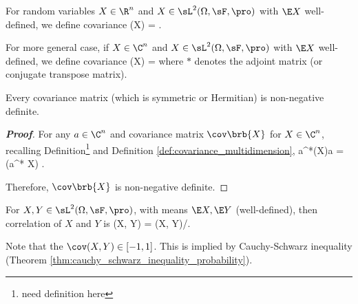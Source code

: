 \begin{definition}\label{def:covariance_multidimension}
For random variables $X\in \R^n$ and $X \in \sL^2(\Omega,\sF,\pro)$ with $\E X$ well-defined, we define covariance
\be
\cov(X) = \E{}.
\ee

For more general case, if $X\in \C^n$ and $X \in \sL^2(\Omega,\sF,\pro)$ with $\E X$ well-defined, we define covariance
\be
\cov(X) = \E{}
\ee
where $*$ denotes the adjoint matrix (or conjugate transpose matrix).
\end{definition}


\begin{proposition}
Every covariance matrix (which is symmetric or Hermitian) is non-negative definite.
\end{proposition}

\begin{proof}[\bf Proof]
For any $a \in \C^n$ and covariance matrix $\cov\brb{X}$ for $X\in \C^n$, recalling Definition\footnote{need definition here} and Definition \ref{def:covariance_multidimension},
\be
a^*\cov(X)a = \var(a^* X) .
\ee

Therefore, $\cov\brb{X}$ is non-negative definite.
\end{proof}

\begin{definition}\label{def:correlation}
For $X, Y \in \sL^2(\Omega,\sF,\pro)$, with means $\E X, \E Y$ (well-defined), then correlation of $X$ and $Y$ is
\be
\corr(X, Y) = \cov(X, Y)/.
\ee

Note that the $\cov(X,Y) \in [-1,1]$. This is implied by Cauchy-Schwarz inequality (Theorem \ref{thm:cauchy_schwarz_inequality_probability}).
\end{definition}

